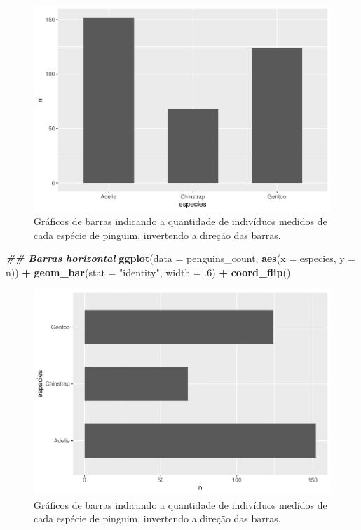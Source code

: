 \documentclass[
]{article}
\newenvironment{Shaded}{\begin{snugshade}}{\end{snugshade}}
\newcommand{\AttributeTok}[1]{\textcolor[rgb]{0.13,0.29,0.53}{#1}}
\newcommand{\DecValTok}[1]{\textcolor[rgb]{0.00,0.00,0.81}{#1}}
\newcommand{\DocumentationTok}[1]{\textcolor[rgb]{0.56,0.35,0.01}{\textbf{\textit{#1}}}}
\newcommand{\FunctionTok}[1]{\textcolor[rgb]{0.13,0.29,0.53}{\textbf{#1}}}
\newcommand{\NormalTok}[1]{#1}
\newcommand{\SpecialCharTok}[1]{\textcolor[rgb]{0.81,0.36,0.00}{\textbf{#1}}}
\newcommand{\StringTok}[1]{\textcolor[rgb]{0.31,0.60,0.02}{#1}}
\begin{document}
\begin{figure}
\includegraphics[width=0.75\linewidth,height=0.75\textheight]{epr_files/figure-latex/fig-bar-species-invert-1} \caption{Gráficos de barras indicando a quantidade de indivíduos medidos de cada espécie de pinguim, invertendo a direção das barras.}\label{fig:fig-bar-species-invert-1}
\end{figure}

\begin{Shaded}
\begin{Highlighting}[]
\DocumentationTok{\#\# Barras horizontal}
\FunctionTok{ggplot}\NormalTok{(}\AttributeTok{data =}\NormalTok{ penguins\_count, }\FunctionTok{aes}\NormalTok{(}\AttributeTok{x =}\NormalTok{ especies, }\AttributeTok{y =}\NormalTok{ n)) }\SpecialCharTok{+}
    \FunctionTok{geom\_bar}\NormalTok{(}\AttributeTok{stat =} \StringTok{"identity"}\NormalTok{, }\AttributeTok{width =}\NormalTok{ .}\DecValTok{6}\NormalTok{) }\SpecialCharTok{+} 
    \FunctionTok{coord\_flip}\NormalTok{()}
\end{Highlighting}
\end{Shaded}

\begin{figure}
\includegraphics[width=0.75\linewidth,height=0.75\textheight]{epr_files/figure-latex/fig-bar-species-invert-2} \caption{Gráficos de barras indicando a quantidade de indivíduos medidos de cada espécie de pinguim, invertendo a direção das barras.}\label{fig:fig-bar-species-invert-2}
\end{figure}
\end{document}
